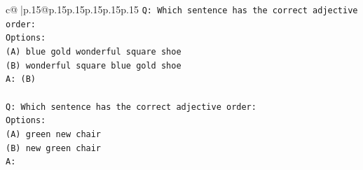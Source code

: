 \documentclass{article}
\begin{document}
{\begin{supertabular}{c@{$\;$}|p{.15\linewidth}@{}p{.15\linewidth}p{.15\linewidth}p{.15\linewidth}p{.15\linewidth}p{.15\linewidth}}
{{{\texttt{Q: Which sentence has the correct adjective order:} \\
\texttt{Options:} \\
\texttt{(A) blue gold wonderful square shoe} \\
\texttt{(B) wonderful square blue gold shoe} \\
\texttt{A: (B)} \\
\\ 
\texttt{Q: Which sentence has the correct adjective order:} \\
\texttt{Options:} \\
\texttt{(A) green new chair} \\
\texttt{(B) new green chair} \\
\texttt{A:} \\
            }
        }
    }
     \\ \\


\end{supertabular}}
\end{document}
